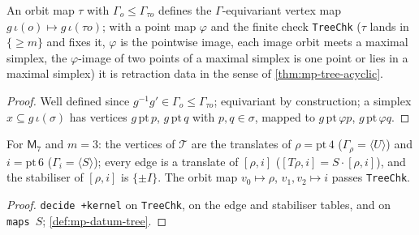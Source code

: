 \begin{definition}\label{def:mp-datum-tree}
  \leanok
  An orbit map $\tau$ with $\Gamma_o\le\Gamma_{\tau o}$ defines the $\Gamma$-equivariant vertex map $g\,\iota(o)\mapsto g\,\iota(\tau o)$;
  with a point map $\varphi$ and the finite check \texttt{TreeChk} ($\tau$ lands in $\{\ge m\}$ and fixes it, $\varphi$ is the
  pointwise image, each image orbit meets a maximal simplex, the $\varphi$-image of two points of a maximal simplex is one point or
  lies in a maximal simplex) it is retraction data in the sense of \ref{thm:mp-tree-acyclic}.
\end{definition}
\begin{proof}
  \leanok
  Well defined since $g^{-1}g'\in\Gamma_o\le\Gamma_{\tau o}$; equivariant by construction; a simplex $x\subseteq g\,\iota(\sigma)$ has
  vertices $g\,\mathrm{pt}\,p$, $g\,\mathrm{pt}\,q$ with $p,q\in\sigma$, mapped to $g\,\mathrm{pt}\,\varphi p$, $g\,\mathrm{pt}\,\varphi q$.
\end{proof}

\begin{theorem}\label{thm:mp-model7-tree}
  \leanok
  For $\mathsf M_7$ and $m=3$: the vertices of $\mathcal T$ are the translates of $\rho=\mathrm{pt}\,4$ ($\Gamma_\rho=\langle U\rangle$)
  and $i=\mathrm{pt}\,6$ ($\Gamma_i=\langle S\rangle$); every edge is a translate of $[\rho,i]$ ($[T\rho,i]=S\cdot[\rho,i]$), and the
  stabiliser of $[\rho,i]$ is $\{\pm I\}$.  The orbit map $v_0\mapsto\rho$, $v_1,v_2\mapsto i$ passes \texttt{TreeChk}.
\end{theorem}
\begin{proof}
  \leanok
  \texttt{decide +kernel} on \texttt{TreeChk}, on the edge and stabiliser tables, and on \texttt{maps}~$S$; \ref{def:mp-datum-tree}.
\end{proof}

